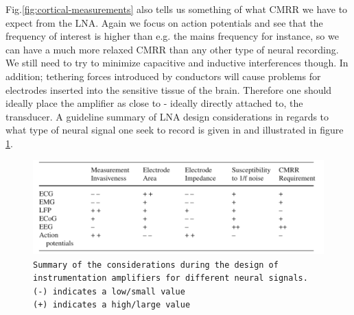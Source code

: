     Fig.\ref{fig:cortical-measurements} also tells us something of what \acf{CMRR} we have to expect from the LNA. Again we focus on action potentials and see that the frequency of interest is higher than e.g. the mains frequency for instance, so we can have a much more relaxed \acs{CMRR} than any other type of neural recording. We still need to try to minimize capacitive and inductive interferences though. In addition; tethering forces introduced by conductors will cause problems for electrodes inserted into the sensitive tissue of the brain. Therefore one should ideally place the amplifier as close to - ideally directly attached to, the transducer. A guideline summary of LNA design considerations in regards to what type of neural signal one seek to record is given in \cite{yoo2011biomedical-cmos} and illustrated in figure \ref{tab:lna-design-considerations}.
    \begin{figure}
      \centering
      \includegraphics[scale=.5]{images/table-LNA-design-considerations.png}
      \captionsetup{singlelinecheck=off}
      \caption[\texttt{\footnotesize{LNA design considerations}}]{\texttt{\footnotesize{Summary of the considerations during the design of instrumentation amplifiers for different neural signals.\\
					      (-) indicates a low/small value \\
					      (+) indicates a high/large value}}}
      \label{tab:lna-design-considerations}
      \end{figure}
       
